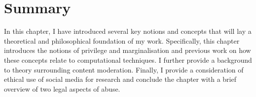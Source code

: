 \section{Summary}
In this chapter, I have introduced several key notions and concepts that will lay a theoretical and philosophical foundation of my work.
Specifically, this chapter introduces the notions of privilege and marginalisation and previous work on how these concepts relate to computational techniques. I further provide a background to theory surrounding content moderation. Finally, I provide a consideration of ethical use of social media for research and conclude the chapter with a brief overview of two legal aspects of abuse.
